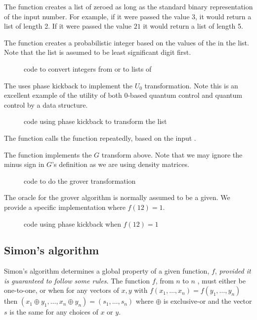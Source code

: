 The function  creates a list of 
zeroed \qubits{} as long as the standard binary representation
of the input number. For example, if it were passed the value $3$, it
would return a list of length 2. If it were passed the value $21$ it 
would return a list of length 5.

The function  creates a probabilistic integer based
on the values of the \qubits{} in the list. Note that the list is 
assumed to be least significant digit first.

\begin{figure}[htbp]

\caption{\lqpl{} code to convert integers from or to lists of \qbits{}}\label{fig:intandlist}
\end{figure}

The  uses phase kickback to implement the 
$U_0$ transformation. Note this is an excellent example of the utility
of both $0$-based quantum control and quantum control by a 
data structure.
\begin{figure}[htbp]

\caption{\lqpl{} code using phase kickback to transform the list}\label{fig:phase}
\end{figure}

The function  calls the function  
repeatedly, based on the input .

The  function implements the $G$ transform above. Note
that we may ignore the minus sign in $G$'s definition as we are
using density matrices.

\begin{figure}[htbp]

\caption{\lqpl{} code to do the grover transformation}\label{fig:grovertrans}
\end{figure}

The oracle for the grover algorithm is normally assumed to be
a given. We provide a specific implementation where $f(12) = 1$.


\begin{figure}[htbp]

\caption{\lqpl{} code using phase kickback when $f(12) =1$}\label{fig:groveroracle}
\end{figure}


\subsection{Simon's algorithm}\label{appsubsec:simonsalgorithm}
Simon's algorithm determines a global property of a given function, $f$,
\emph{provided it is guaranteed to follow some rules}. The function $f$, 
from $n$ \bits{} to $n$ \bits, must either be one-to-one, or when for
any vectors of \bits{} $x, y$ with
$f(x_1,\dots,x_n) = f(y_1,\dots,y_n)$ then 
$(x_1\oplus y_1, \dots , x_n \oplus y_n) = (s_1, \dots, s_n)$ where
$\oplus$ is exclusive-or and the vector $s$ is the same for any choices
of $x$ or $y$.


